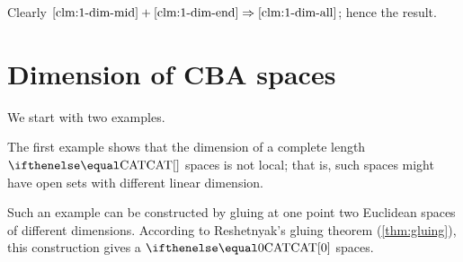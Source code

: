 Clearly $\text{\ref{clm:1-dim-mid}}+\text{\ref{clm:1-dim-end}}\Rightarrow\text{\ref{clm:1-dim-all}}$;
hence the result.
\qeds

\begin{comment}
\parit{Proof 2.}
According to \ref{LinDim+-f}, there is a point $p\in\spc{L}$, such that $\T_p\iso\RR$;
that is, $\Sigma_p$ consists of two directions $\xi_+$, $\xi_-$ on angle $\pi$.
Both of directions $\xi_+$, $\xi_-$ have to be geodesic;
otherwise the set of geodesic directions $\Sigma_p'$ would not be dense in $\Sigma_p$.
Let $\gamma_+$ and $\gamma_-$ be maximal geodesics in directions $\xi_+$ and $\xi_-$ correspondingly.

The geodesics $\gamma_+$ and $\gamma_-$ cover $\spc{L}$ completely;
that follows sinse $\spc{L}$ is geodesic (\ref{cor:dim>proper}) and since geodesics in $\spc{L}$ do not bifurcate (\ref{thm:g-split}).
It is easy to see that only following cases can occur
\begin{itemize}
\item both $\gamma_+$ and $\gamma_-$ are defined on $[0,\infty)$.
In this case $\spc{L}\iso\RR$.
\item $\gamma_+$ is defined on closed interval, say $[0,a]$ and $\gamma_-$ is defined of an infinite interval $[0,\infty)$ (or vise versa).
In this case $\spc{L}\iso\RR_{\ge0}$.
\item both $\gamma_+$ and $\gamma_-$ are defined on closed intervals, say $[0,a]$ and $[0,b]$ and $\gamma_+(a)\not=\gamma_-(b)$.
In this case $\spc{L}\iso[0,a+b]$.
\item both $\gamma_+$ and $\gamma_-$ are defined on one closed interval, say $[0,a]$ and $\gamma_+(a)=\gamma_-(a)$.
In this case, $\spc{L}\iso\tfrac{a}{\pi}\blow\SS^1$.
\end{itemize}
Hence the result.\qeds
\end{comment}





\section{Dimension of CBA spaces}\label{sec:dim-cba}

We start with two examples.

The first example shows that the dimension of a complete length $\CAT{}$ spaces is not local;
that is, such spaces might have open sets with different linear dimension.

Such an example can be constructed by gluing at one point two Euclidean spaces of different dimensions.
According to Reshetnyak's gluing theorem (\ref{thm:gluing}), this construction gives a $\CAT{0}$ spaces.

